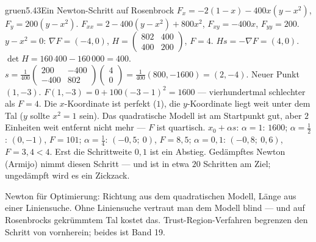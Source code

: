 \begin{loesungkarte}{gruen}{5.43}{Ein Newton-Schritt auf Rosenbrock}
$F_x = -2(1 - x) - 400x(y - x^{2})$, $F_y = 200(y - x^{2})$. $F_{xx} = 2 - 400(y - x^{2}) + 800x^{2}$, $F_{xy} = -400x$, $F_{yy} = 200$.
$y - x^{2} = 0$: $\nabla F = (-4, 0)$, $H = \begin{pmatrix}802 & 400\\ 400 & 200\end{pmatrix}$, $F = 4$.
$Hs = -\nabla F = (4, 0)$. $\det H = 160\,400 - 160\,000 = 400$. $s = \frac1{400}\begin{pmatrix}200 & -400\\ -400 & 802\end{pmatrix}\begin{pmatrix}4\\ 0\end{pmatrix} = \frac1{400}(800, -1600) = (2, -4)$. Neuer Punkt $(1, -3)$.
$F(1, -3) = 0 + 100(-3 - 1)^{2} = 1600$ --- vierhundertmal schlechter als $F = 4$. Die $x$-Koordinate ist perfekt ($1$), die $y$-Koordinate liegt weit unter dem Tal ($y$ sollte $x^{2} = 1$ sein). Das quadratische Modell ist am Startpunkt gut, aber $2$ Einheiten weit entfernt nicht mehr --- $F$ ist quartisch.
$x_0 + \alpha s$: $\alpha = 1$: $1600$; $\alpha = \frac12$: $(0, -1)$, $F = 101$; $\alpha = \frac14$: $(-0{,}5;\ 0)$, $F = 8{,}5$; $\alpha = 0{,}1$: $(-0{,}8;\ 0{,}6)$, $F = 3{,}4 < 4$. Erst die Schrittweite $0{,}1$ ist ein Abstieg. Gedämpftes Newton (Armijo) nimmt diesen Schritt --- und ist in etwa $20$ Schritten am Ziel; ungedämpft wird es ein Zickzack.
\begin{mitnehmen}\kastentext
Newton für Optimierung: Richtung aus dem quadratischen Modell, Länge aus einer Liniensuche. Ohne Liniensuche vertraut man dem Modell blind --- und auf Rosenbrocks gekrümmtem Tal kostet das. Trust-Region-Verfahren begrenzen den Schritt von vornherein; beides ist Band 19.
\end{mitnehmen}
\end{loesungkarte}

